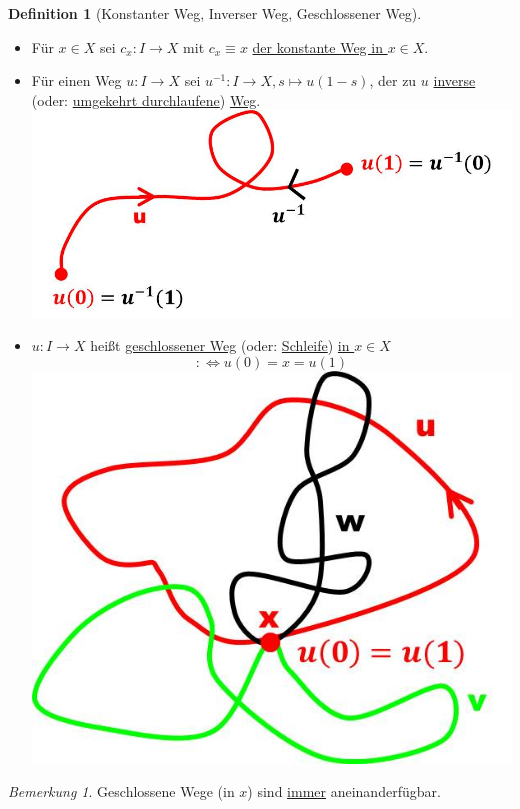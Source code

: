 \documentclass[a4paper,11pt,notitlepage]{report}
\theoremstyle{remark}
\newtheorem{remark}{Bemerkung}[chapter]
\theoremstyle{definition}
\newtheorem{definition}{Definition}[chapter]
\begin{document}
\begin{definition}[Konstanter Weg, Inverser Weg, Geschlossener Weg]
	\begin{itemize}
		\item Für $x \in X$ sei $c_x \colon I \rightarrow X$ mit $c_x \equiv x$ \underline{der konstante Weg in $x \in X$}.
		\item Für einen Weg $u \colon I \rightarrow X$ sei $u^{-1} \colon I \rightarrow X, s \mapsto u(1-s)$, der zu $u$ \underline{inverse} (oder: \underline{umgekehrt durchlaufene}) \underline{Weg}. \includegraphics[scale=0.4]{images/inverser_Weg.jpg}
		\item $u \colon I \rightarrow X$ heißt \underline{geschlossener Weg} (oder: \underline{Schleife}) \underline{in $x \in X$} 
		$$:\Leftrightarrow u(0) = x = u(1)$$ \includegraphics[scale=0.4]{images/Schleifen.jpg}
	\end{itemize}
\end{definition}

\begin{remark}{}
	Geschlossene Wege (in $x$) sind \underline{immer} aneinanderfügbar.
\end{remark}
\end{document}
